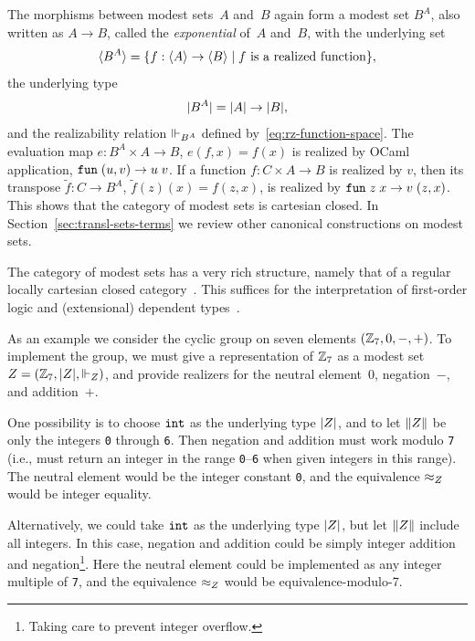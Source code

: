 The morphisms between modest sets~$A$ and~$B$ again form a modest set
$B^A$, also written as $A \to B$, called the \emph{exponential} of~$A$
and~$B$, with the underlying set
%
\begin{equation*}
  \langle B^A \rangle =
  \{f : \langle A \rangle \to \langle B \rangle \mid \text{$f$ is a realized function}\},
\end{equation*}
%
the underlying type
%
\begin{equation*}
  |B^A| = |A| \to |B|,
\end{equation*}
%
and the realizability relation $\Vdash_{B^A}$ defined
by~\eqref{eq:rz-function-space}. The evaluation map $e : B^A \times A
\to B$, $e(f,x) = f(x)$ is realized by OCaml application,
$\mathtt{fun}\;(u,v) \to u\;v$. If a function $f : C \times A \to B$ is realized
by $v$, then its transpose $\tilde{f} : C \to B^A$, $\tilde{f}(z)(x) =
f(z,x)$, is realized by $\mathtt{fun}\;z\;x \to v \; (z,x)$. This shows that the
category of modest sets is cartesian closed. In
Section~\ref{sec:transl-sets-terms} we review other canonical
constructions on modest sets.

\bigskip
\else %
%
The category of modest sets has a very rich structure, namely that of
a regular locally cartesian closed category~\cite{Bauer:00}. This
suffices for the interpretation of first-order logic and (extensional)
dependent types~\cite{JacobsB:cltt}.
%
\fi %

\iflong
As an example we consider the cyclic group on seven elements $(\mathbb{Z}_7,
0, {-}, {+})$. To implement the group, we must give a representation
of $\mathbb{Z}_7$ as a modest set~$Z = (\mathbb{Z}_7, |Z|, {\Vdash_Z})$, and
provide realizers for the neutral element~$0$, negation~$-$, and
addition~$+$. 

One possibility is to choose $\mathtt{int}$ as the underlying type $|Z|$,
and to let $\|Z\|$ be only the integers \texttt{0} through \texttt{6}.
Then negation and addition must work modulo \texttt{7} (i.e., must return an integer in the
range \texttt{0}--\texttt{6} when given integers in this range).
The neutral element would be the integer constant \texttt{0}, and the
equivalence $\approx_Z$ would be integer equality.

Alternatively, we could take $\mathtt{int}$ as the underlying type
$|Z|$, but let $\|Z\|$ include all integers. In this
case, negation and addition could be simply integer addition and
negation\footnote{Taking care to prevent integer
  overflow.}. Here the neutral element could be implemented as any
integer multiple of \texttt{7}, and the equivalence $\approx_Z$ would be
equivalence-modulo-7.

